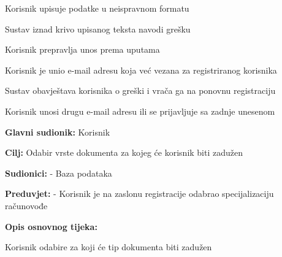 \begin{packed_item}
\begin{packed_item}
							\item[1.a]Korisnik upisuje podatke u neispravnom formatu 
							\item[] \begin{packed_enum}
								\item Sustav iznad krivo upisanog teksta navodi grešku
								\item Korisnik prepravlja unos prema uputama
							\end{packed_enum}
							\item[3.a]Korisnik je unio e-mail adresu koja već vezana za registriranog korisnika
							\item[] \begin{packed_enum}	
								\item Sustav obavještava korisnika o greški i vrača ga na ponovnu registraciju
								\item Korisnik unosi drugu e-mail adresu ili se prijavljuje sa zadnje unesenom
							\end{packed_enum}
						\end{packed_item}
					\end{packed_item}
					
					\noindent {}
						\begin{packed_item}
		
							\item \textbf{Glavni sudionik:} Korisnik
							\item  \textbf{Cilj:} Odabir vrste dokumenta za kojeg će korisnik biti zadužen
							\item  \textbf{Sudionici:} - Baza podataka
							\item  \textbf{Preduvjet:} - Korisnik je na zaslonu registracije odabrao specijalizaciju računovođe
							\item  \textbf{Opis osnovnog tijeka:}
							
							\item[] \begin{packed_enum}
								\item Korisnik odabire za koji će tip dokumenta biti zadužen
							\end{packed_enum}
						\end{packed_item}

